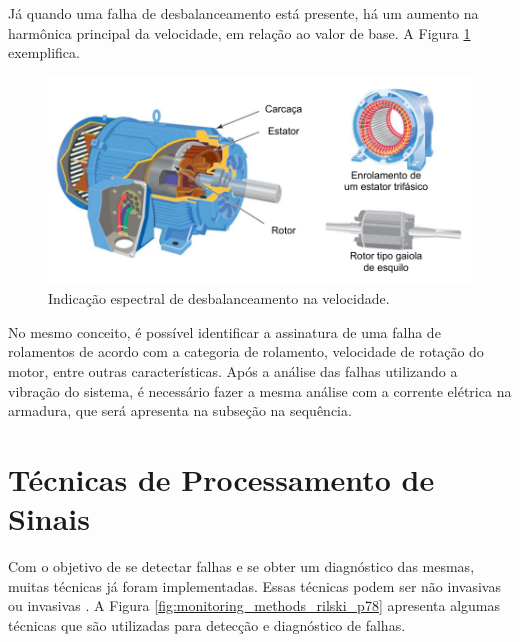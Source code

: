 Já quando uma falha de desbalanceamento está presente, há um aumento na harmônica principal da velocidade, em relação ao valor de base.
A Figura \ref{fig:imbalance_analog_p2} exemplifica.

\begin{figure}[H]
    \caption{Indicação espectral de desbalanceamento na velocidade.}
    \begin{center}
        \includegraphics[scale=0.8, page=7]{referencial/img/imagens_referencial.pdf}
    \end{center}
    \label{fig:imbalance_analog_p2}
\end{figure}

No mesmo conceito, é possível identificar a assinatura de uma falha de rolamentos de acordo com a categoria de rolamento, velocidade de rotação
do motor, entre outras características. Após a análise das falhas utilizando a vibração do sistema, é necessário fazer a mesma análise com a corrente elétrica na armadura, 
que será apresenta na subseção na sequência.



% 

\section{Técnicas de Processamento de Sinais}\label{sec:signal_process}

Com o objetivo de se detectar falhas e se obter um diagnóstico das mesmas, muitas técnicas já foram implementadas. Essas técnicas podem ser
não invasivas ou invasivas \cite{Gorbounov2018}. A Figura \ref{fig:monitoring_methods_rilski_p78} apresenta algumas técnicas que são
utilizadas para detecção e diagnóstico de falhas.

